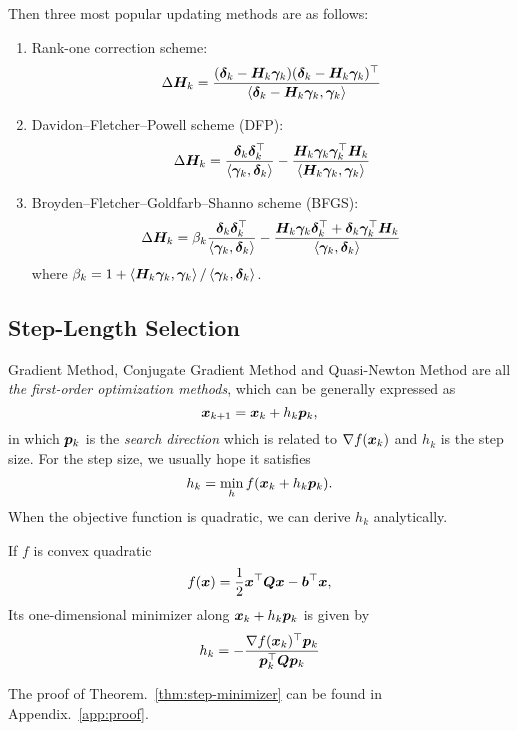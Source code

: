 Then three most popular updating methods are as follows:
\begin{enumerate}
    \item {Rank-one correction scheme}:
        \[
            \Delta \bm{H}_k = \frac{(\bm{\delta}_k - \bm{H}_k\bm{\gamma}_k)(\bm{\delta}_k - \bm{H}_k\bm{\gamma}_k)^\top}{\left\langle \bm{\delta}_k - \bm{H}_k\bm{\gamma}_k,\bm{\gamma}_k \right\rangle}  
        \]
    \item {Davidon–Fletcher–Powell scheme (DFP)}:
        \[
            \Delta \bm{H}_k = \frac{\bm{\delta}_k\bm{\delta}_k^\top}{\left\langle \bm{\gamma}_k,\bm{\delta}_k \right\rangle} 
            - \frac{\bm{H}_k\bm{\gamma}_k\bm{\gamma}_k^\top\bm{H}_k}{\left\langle \bm{H}_k\bm{\gamma}_k,\bm{\gamma}_k \right\rangle}
        \]
    \item {Broyden–Fletcher–Goldfarb–Shanno scheme (BFGS)}:
        \[
            \Delta \bm{H}_k = \beta_k \frac{\bm{\delta}_k\bm{\delta}_k^\top}{\left\langle \bm{\gamma}_k,\bm{\delta}_k \right\rangle} 
            - \frac{\bm{H}_k\bm{\gamma}_k\bm{\delta}_k^\top + \bm{\delta}_k\bm{\gamma}_k^\top\bm{H}_k}{\left\langle \bm{\gamma}_k,\bm{\delta}_k \right\rangle}
        \]
        where \(\beta_k = 1 + \left\langle \bm{H}_k\bm{\gamma}_k,\bm{\gamma}_k \right\rangle / \left\langle \bm{\gamma}_k,\bm{\delta}_k \right\rangle\).
\end{enumerate}

\subsection{Step-Length Selection}

Gradient Method, Conjugate Gradient Method and Quasi-Newton Method are all \emph{the first-order optimization methods}, 
which can be generally expressed as
\[
    \bm{x}_{k+1} = \bm{x}_k + h_k \bm{p}_k,  
\] 
in which \(\bm{p}_k\) is the \emph{search direction} which is related to \(\nabla f(\bm{x}_k)\) and \(h_k\) is the step size. For the step size, we usually hope
it satisfies
\[
    h_k = \min_{h} f(\bm{x}_k + h_k \bm{p}_k).  
\]
When the objective function is quadratic, we can derive \(h_k\) analytically.

\begin{thm}\label{thm:step-minimizer}
    If \(f\) is convex quadratic
    \[
        f(\bm{x}) = \frac{1}{2} \bm{x}^\top \bm{Q} \bm{x} - \bm{b}^\top \bm{x},  
    \]
    Its one-dimensional minimizer along \(\bm{x}_k + h_k \bm{p}_k\) is given by
    \[
        h_k = -\frac{\nabla f(\bm{x}_k)^\top \bm{p}_k}
        {\bm{p}_k^\top \bm{Q}\bm{p}_k}    
    \]
\end{thm}

The proof of Theorem.~\ref{thm:step-minimizer} can be found in Appendix.~\ref{app:proof}.